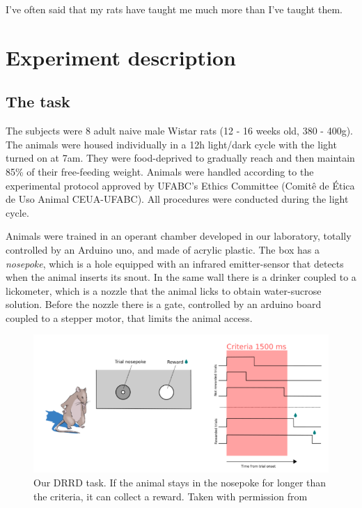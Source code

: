 \begin{savequote}[75mm]
I've often said that my rats have taught me much more than I've taught them.
\end{savequote}

\chapter{Experiment description}
\label{chap:experiment}

\section{The task}
    The subjects were 8 adult naive male Wistar rats (12 - 16 weeks old, 380 - 400g). The animals were housed individually in a 12h light/dark cycle with the light turned on at 7am. They were food-deprived to gradually reach and then maintain 85\% of their free-feeding weight. Animals were handled according to the experimental protocol approved by UFABC's Ethics Committee (Comitê de Ética de Uso Animal CEUA-UFABC). All procedures were conducted during the light cycle.
    
    Animals were trained in an operant chamber developed in our laboratory, totally controlled by an Arduino uno, and made of acrylic plastic. The box has a \textit{nosepoke}, which is a hole equipped with an infrared emitter-sensor that detects when the animal inserts its snout. In the same wall there is a drinker coupled to a lickometer, which is a nozzle that the animal licks to obtain water-sucrose solution. Before the nozzle there is a gate, controlled by an arduino board coupled to a stepper motor, that limits the animal access. 
    
    \begin{figure}
        \centering
        \includegraphics[width=\textwidth]{figures/tarefa_eli.png}
        \caption[Our DRRD task]{Our DRRD task. If the animal stays in the nosepoke for longer than the criteria, it can collect a reward. Taken with permission from \cite{Eliezyer2018}}
        \label{fig:task}
    \end{figure}


